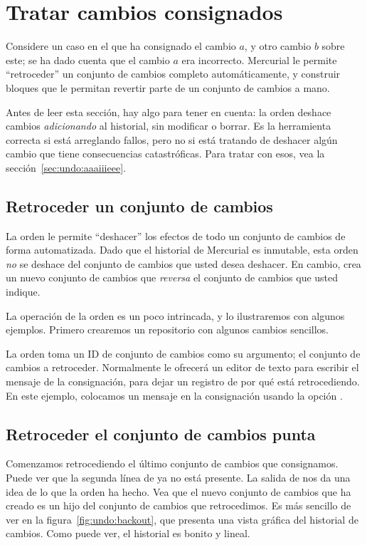 \section{Tratar cambios consignados}

Considere un caso en el que ha consignado el cambio $a$, y otro cambio
$b$ sobre este; se ha dado cuenta que el cambio $a$ era
incorrecto. Mercurial le permite ``retroceder'' un conjunto de cambios
completo automáticamente, y construir bloques que le permitan revertir
parte de un conjunto de cambios a mano.

Antes de leer esta sección, hay algo para tener en cuenta: la orden
 deshace cambios \emph{adicionando} al historial, sin
modificar o borrar.  Es la herramienta correcta si está arreglando
fallos, pero no si está tratando de deshacer algún cambio que tiene
consecuencias catastróficas.  Para tratar con esos, vea la sección~\ref{sec:undo:aaaiiieee}.

\subsection{Retroceder un conjunto de cambios}

La orden  le permite ``deshacer'' los efectos de todo
un conjunto de cambios de forma automatizada.  Dado que el historial de
Mercurial es inmutable, esta orden \emph{no} se deshace del conjunto
de cambios que usted desea deshacer.  En cambio, crea un nuevo
conjunto de cambios que \emph{reversa} el conjunto de cambios que
usted indique.

La operación de la orden  es un poco intrincada, y lo
ilustraremos con algunos ejemplos. Primero crearemos un repositorio
con algunos cambios sencillos.

La orden  toma un ID de conjunto de cambios como su
argumento; el conjunto de cambios a retroceder. Normalmente
 le ofrecerá un editor de texto para escribir el
mensaje de la consignación, para dejar un registro de por qué está
retrocediendo. En este ejemplo, colocamos un mensaje en la
consignación usando la opción .

\subsection{Retroceder el conjunto de cambios punta}

Comenzamos retrocediendo el último conjunto de cambios que consignamos.
Puede ver que la segunda línea de  ya no está
presente.  La salida de  nos da una idea de lo que la orden
 ha hecho.
Vea que el nuevo conjunto de cambios que  ha creado es
un hijo del conjunto de cambios que retrocedimos. Es más sencillo de
ver en la figura~\ref{fig:undo:backout}, que presenta una vista
gráfica del historial de cambios.  Como puede ver, el historial es
bonito y lineal.

